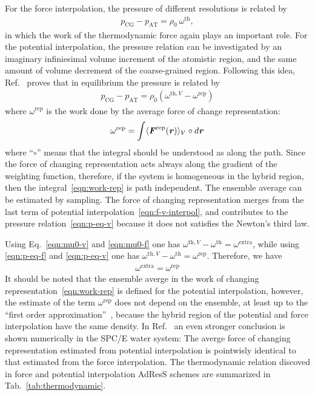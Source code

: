 \documentclass[epjST]{svjour}
\newcommand{\vect}[1]{\textbf{\textit{#1}}}
\newcommand{\AT}[0]{\textrm{AT}}
\newcommand{\CG}[0]{\textrm{CG}}
\newcommand{\thf}{{\textrm{th}}}
\newcommand{\rep}{{\textrm{rep}}}
\newcommand{\exc}{{\textrm{extra}}}
\begin{document}
For the force interpolation, the pressure of different resolutions
is related by~\cite{fritsch2012adaptive}
\begin{align}\label{eqn:p-eq-f}
  p_\CG - p_\AT = \rho_0 \:\omega^{\thf},
\end{align}
in which the work of the thermodynamic force again plays an important
role.  For the potential interpolation, the pressure relation can be
investigated by an imaginary infiniesimal volume increment of the atomistic
region, and the same amount of volume decrement of the coarse-grained
region. Following this idea, Ref.~\cite{agarwal2014chemical} proves that in
equilibrium the pressure is related by
\begin{align}\label{eqn:p-eq-v}
  p_\CG - p_\AT = \rho_0 (\omega^{\thf,V} - \omega^\rep)  
\end{align}
where $\omega^\rep$ is the work done by the average force of change representation:
\begin{align}\label{eqn:work-rep}
  \omega^\rep = \int \langle \vect F^\rep(\vect r)\rangle_V\circ d\vect r
\end{align}
where ``$\circ$'' means that the integral should be understood as along the path.
Since the force of changing representation acts always along the gradient of the weighting
function, therefore, if the system is homogeneous in the hybrid region, then the integral~\eqref{eqn:work-rep}
is path independent. The ensemble average  can be estimated by sampling.
The force of changing representation merges from the last term of potential
interpolation~\eqref{eqn:f-v-interpol}, and contributes to the
pressure relation~\eqref{eqn:p-eq-v} because it does not satisfies the Newton's third
law.

Using Eq.~\eqref{eqn:mu0-v} and \eqref{eqn:mu0-f} one has $\omega^{\thf,V} - \omega^\thf = \omega^\exc$,
while using \eqref{eqn:p-eq-f} and \eqref{eqn:p-eq-v} one has $\omega^{\thf,V} - \omega^\thf = \omega^\rep$.
Therefore, we have 
\begin{align}
  \omega^\exc = \omega^\rep
\end{align}
It should be noted that the ensemble averge in the work
of changing representation~\eqref{eqn:work-rep} is defined for the
potential interpolation, however, the estimate of the term
$\omega^\rep$ does not depend on the ensemble, at least up to the
``first order approximation''~\cite{agarwal2014chemical}, because the
hybrid region of the potential and force interpolation have the same
density. In Ref.~\cite{wang2013grand} an even stronger conclusion is shown numerically in the SPC/E water system: The
averge force of changing representation estimated from potential
interpolation is pointwisly identical to that estimated from the force
interpolation. The thermodynamic relation discoved in
force and potential interpolation AdResS schemes are summarized
in Tab.~\ref{tab:thermodynamic}.
\end{document}
